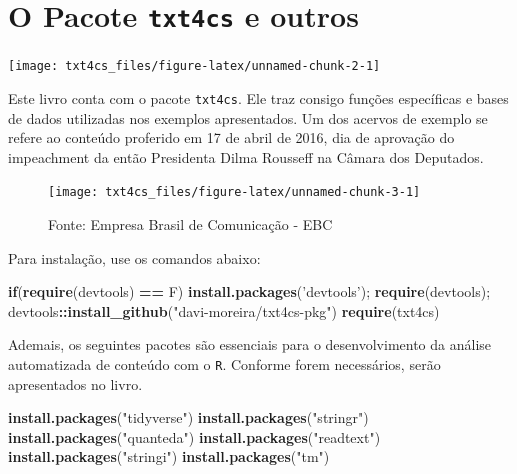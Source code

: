 \documentclass[]{book}
\newenvironment{Shaded}{\begin{snugshade}}{\end{snugshade}}
\newcommand{\ControlFlowTok}[1]{\textcolor[rgb]{0.13,0.29,0.53}{\textbf{#1}}}
\newcommand{\KeywordTok}[1]{\textcolor[rgb]{0.13,0.29,0.53}{\textbf{#1}}}
\newcommand{\NormalTok}[1]{#1}
\newcommand{\OperatorTok}[1]{\textcolor[rgb]{0.81,0.36,0.00}{\textbf{#1}}}
\newcommand{\StringTok}[1]{\textcolor[rgb]{0.31,0.60,0.02}{#1}}
\begin{document}
\hypertarget{o-pacote-txt4cs-e-outros}{%
\section{\texorpdfstring{O Pacote \texttt{txt4cs} e outros}{O Pacote txt4cs e outros}}\label{o-pacote-txt4cs-e-outros}}

\begin{center}\texttt{[image: txt4cs\_files/figure-latex/unnamed-chunk-2-1]} \end{center}

Este livro conta com o pacote \texttt{txt4cs}. Ele traz consigo funções específicas e bases de dados utilizadas nos exemplos apresentados. Um dos acervos de exemplo se refere ao conteúdo proferido em 17 de abril de 2016, dia de aprovação do impeachment da então Presidenta Dilma Rousseff na Câmara dos Deputados.

\begin{figure}

{\centering \texttt{[image: txt4cs\_files/figure-latex/unnamed-chunk-3-1]} 

}

\caption{Fonte: Empresa Brasil de Comunicação - EBC}\label{fig:unnamed-chunk-3}
\end{figure}

Para instalação, use os comandos abaixo:

\begin{Shaded}
\begin{Highlighting}[]
\ControlFlowTok{if}\NormalTok{(}\KeywordTok{require}\NormalTok{(devtools) }\OperatorTok{==}\StringTok{ }\NormalTok{F) }\KeywordTok{install.packages}\NormalTok{(}\StringTok{'devtools'}\NormalTok{); }\KeywordTok{require}\NormalTok{(devtools);}
\NormalTok{devtools}\OperatorTok{::}\KeywordTok{install_github}\NormalTok{(}\StringTok{"davi-moreira/txt4cs-pkg"}\NormalTok{)}
\KeywordTok{require}\NormalTok{(txt4cs)}
\end{Highlighting}
\end{Shaded}

Ademais, os seguintes pacotes são essenciais para o desenvolvimento da análise automatizada de conteúdo com o \texttt{R}. Conforme forem necessários, serão apresentados no livro.

\begin{Shaded}
\begin{Highlighting}[]
\KeywordTok{install.packages}\NormalTok{(}\StringTok{"tidyverse"}\NormalTok{)}
\KeywordTok{install.packages}\NormalTok{(}\StringTok{"stringr"}\NormalTok{)}
\KeywordTok{install.packages}\NormalTok{(}\StringTok{"quanteda"}\NormalTok{)}
\KeywordTok{install.packages}\NormalTok{(}\StringTok{"readtext"}\NormalTok{)}
\KeywordTok{install.packages}\NormalTok{(}\StringTok{"stringi"}\NormalTok{)}
\KeywordTok{install.packages}\NormalTok{(}\StringTok{"tm"}\NormalTok{)}
\end{Highlighting}
\end{Shaded}
\end{document}

